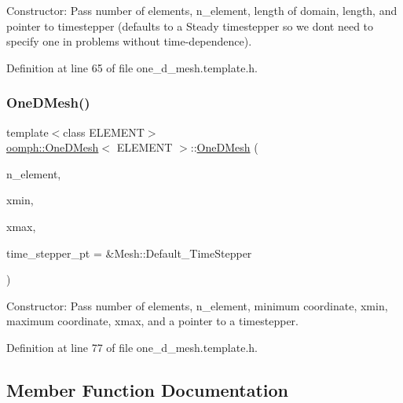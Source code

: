 Constructor\+: Pass number of elements, n\+\_\+element, length of domain, length, and pointer to timestepper (defaults to a Steady timestepper so we don\textquotesingle{}t need to specify one in problems without time-\/dependence). 



Definition at line 65 of file one\+\_\+d\+\_\+mesh.\+template.\+h.

\mbox{\label{classoomph_1_1OneDMesh_a1a8b9e65226f10dfbb48fe2362e83014}} 
\subsubsection{\texorpdfstring{One\+D\+Mesh()}{OneDMesh()}\hspace{0.1cm}{\footnotesize\ttfamily [2/2]}}
{\footnotesize\ttfamily template$<$class E\+L\+E\+M\+E\+NT$>$ \\
\hyperlink{classoomph_1_1OneDMesh}{oomph\+::\+One\+D\+Mesh}$<$ E\+L\+E\+M\+E\+NT $>$\+::\hyperlink{classoomph_1_1OneDMesh}{One\+D\+Mesh} (\begin{DoxyParamCaption}\item[{const unsigned \&}]{n\+\_\+element,  }\item[{const double \&}]{xmin,  }\item[{const double \&}]{xmax,  }\item[{Time\+Stepper $\ast$}]{time\+\_\+stepper\+\_\+pt = {\ttfamily \&Mesh\+:\+:Default\+\_\+TimeStepper} }\end{DoxyParamCaption})\hspace{0.3cm}{\ttfamily [inline]}}



Constructor\+: Pass number of elements, n\+\_\+element, minimum coordinate, xmin, maximum coordinate, xmax, and a pointer to a timestepper. 



Definition at line 77 of file one\+\_\+d\+\_\+mesh.\+template.\+h.



\subsection{Member Function Documentation}
\mbox{\label{classoomph_1_1OneDMesh_a5a1a27eaa9d58bb85facb617127e9f0a}} 
